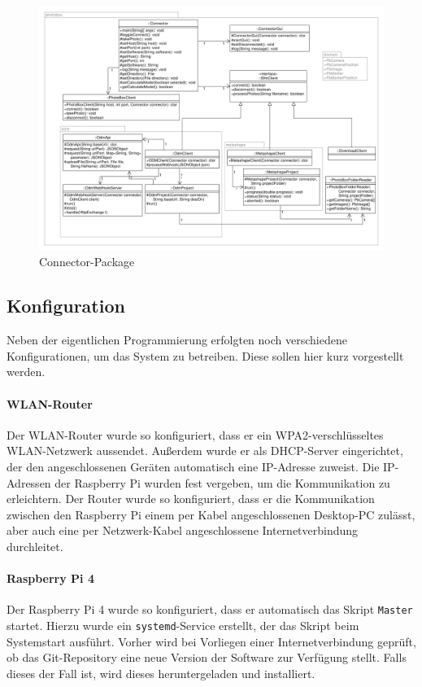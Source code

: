 \documentclass[./00PhotoBox.tex]{subfiles}
\begin{document}
\begin{figure}
  \centering
  \includegraphics[width=1\textwidth]{./img/uml/uml_connector_classdiagramm.pdf}
  \caption{Connector-Package} %
  \label{img:uml_connector} %
\end{figure}

\subsection{Konfiguration}
Neben der eigentlichen Programmierung erfolgten noch verschiedene Konfigurationen, um das System zu betreiben. Diese sollen hier kurz vorgestellt werden.

\paragraph{WLAN-Router}
Der WLAN-Router wurde so konfiguriert, dass er ein WPA2-ver\-schlüssel\-tes WLAN-Netzwerk aussendet. Außerdem wurde er als DHCP-Server eingerichtet, der den angeschlossenen Geräten automatisch eine IP-Adresse zuweist. Die IP-Adressen der Raspberry Pi wurden fest vergeben, um die Kommunikation zu erleichtern. Der Router wurde so konfiguriert, dass er die Kommunikation zwischen den Raspberry Pi einem per Kabel angeschlossenen Desktop-PC zulässt, aber auch eine per Netzwerk-Kabel angeschlossene Internetverbindung durchleitet.

\paragraph{Raspberry Pi 4}
Der Raspberry Pi 4 wurde so konfiguriert, dass er automatisch das Skript \texttt{Master} startet. Hierzu wurde ein \texttt{systemd}-Service erstellt, der das Skript beim Systemstart ausführt. Vorher wird bei Vorliegen einer Internetverbindung geprüft, ob das Git-Repository eine neue Version der Software zur Verfügung stellt. Falls dieses der Fall ist, wird dieses heruntergeladen und installiert.
\end{document}
